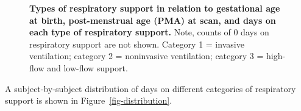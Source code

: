 \documentclass[
  letterpaper,
  DIV=11,
  numbers=noendperiod]{scrartcl}
\begin{document}
\begin{figure}


\caption{\label{fig-dayscat}\textbf{Types of respiratory support in
relation to gestational age at birth, post-menstrual age (PMA) at scan,
and days on each type of respiratory support.} Note, counts of 0 days on
respiratory support are not shown. Category 1 = invasive ventilation;
category 2 = noninvasive ventilation; category 3 = high-flow and
low-flow support.}

\end{figure}%

A subject-by-subject distribution of days on different categories of
respiratory support is shown in Figure~\ref{fig-distribution}.
\end{document}
